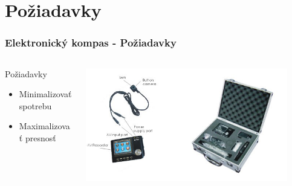 \section{Požiadavky}
\begin{snimka}
 \frametitle{Elektronický kompas - Požiadavky}
   \begin{columns}[c]
    \begin{column}{0.4\textwidth}
    \begin{block}{Požiadavky}
    \begin{itemize}
         \item Minimalizovať spotrebu
         \item Maximalizovať presnosť
     \end{itemize}
  \end{block}
   \end{column}
    \begin{column}{0.6\textwidth}
     \begin{center}
        \includegraphics[width=0.9\textwidth]{obr/poziadavky.jpg}
      \end{center}
    \end{column}
  \end{columns}
\end{snimka}